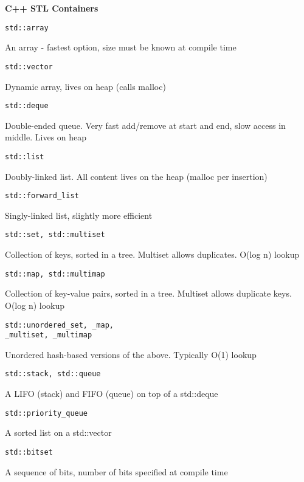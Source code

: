 \begingroup



\begin{center}
\textbf{C++ STL Containers}
\end{center}

\begin{multicols}{2}

\begin{lstlisting}
std::array
\end{lstlisting}
An array - fastest option, size must be known at compile time
\begin{lstlisting}
std::vector
\end{lstlisting}
Dynamic array, lives on heap (calls malloc)
\begin{lstlisting}
std::deque
\end{lstlisting}
Double-ended queue. Very fast add/remove at start and end, slow access in middle.  Lives on heap
\begin{lstlisting}
std::list
\end{lstlisting}
Doubly-linked list.  All content lives on the heap (malloc per insertion)
\begin{lstlisting}
std::forward_list
\end{lstlisting}
Singly-linked list, slightly more efficient

\begin{lstlisting}
std::set, std::multiset
\end{lstlisting}
Collection of keys, sorted in a tree.  Multiset allows duplicates.  O(log n) lookup
\begin{lstlisting}
std::map, std::multimap
\end{lstlisting}
Collection of key-value pairs, sorted in a tree.  Multiset allows duplicate keys.  O(log n) lookup

\begin{lstlisting}
std::unordered_set, _map,
_multiset, _multimap
\end{lstlisting}
Unordered hash-based versions of the above.  Typically O(1) lookup

\begin{lstlisting}
std::stack, std::queue
\end{lstlisting}
A LIFO (stack) and FIFO (queue) on top of a std::deque

\begin{lstlisting}
std::priority_queue
\end{lstlisting}
A sorted list on a std::vector

\begin{lstlisting}
std::bitset
\end{lstlisting}
A sequence of bits, number of bits specified at compile time
\end{multicols}

